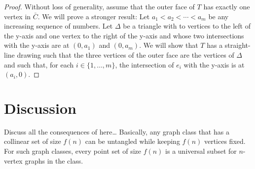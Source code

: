\documentclass{patmorin}
\begin{document}
\begin{proof}
   

   

   Without loss of generality, assume that the outer face of $T$ has
   exactly one vertex in $\bar{C}$.  We will prove a stronger result:
   Let $a_1<a_2<\cdots<a_m$ be any increasing sequence of numbers.
   Let $\Delta$ be a triangle with to vertices to the left of the y-axis
   and one vertex to the right of the y-axis and whose two intersections
   with the y-axis are at $(0,a_1)$ and $(0,a_m)$.  We will show that
   $T$ has a straight-line drawing such that the three vertices of
   the outer face are the vertices of $\Delta$ and such that, for each
   $i\in\{1,\ldots,m\}$, the intersection of $e_i$ with the y-axis is
   at $(a_i,0)$.

    
\end{proof}



\section{Discussion}

Discuss all the consequences of  here\ldots
Basically, any graph class that has a collinear set of size $f(n)$ can 
be untangled while keeping $f(n)$ vertices fixed.  For such graph classes,
every point set of size $f(n)$ is a universal subset for $n$-vertex graphs
in the class.
\end{document}
